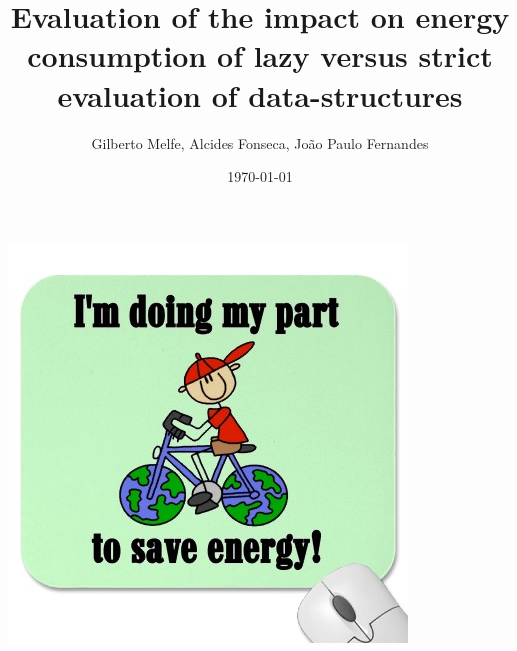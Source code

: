 \documentclass[10pt]{beamer}
\title%
{Evaluation of the impact on energy consumption of lazy versus strict evaluation of data-structures}
\date{\today}
\author[G. Melfe, A. Fonseca, J. P. Fernandes]{Gilberto Melfe, Alcides Fonseca, Jo\~{a}o Paulo Fernandes}
\begin{document}



        \begin{frame}

            \maketitle


        \end{frame}



        

        

        

        



        \begin{frame}

            \maketitle

            \includegraphics[width=.25\textwidth]{images/i_m_saving_energy} 


        \end{frame}




    
\end{document}

